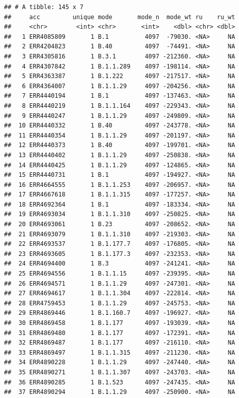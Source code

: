 \documentclass[
]{article}
\begin{document}
\begin{verbatim}
## # A tibble: 145 x 7
##     acc         unique mode       mode_n  mode_wt ru    ru_wt
##     <chr>        <int> <chr>       <int>    <dbl> <chr> <dbl>
##   1 ERR4085809       1 B.1          4097  -79030. <NA>     NA
##   2 ERR4204823       1 B.40         4097  -74491. <NA>     NA
##   3 ERR4305816       1 B.3.1        4097 -212360. <NA>     NA
##   4 ERR4307842       1 B.1.1.289    4097 -198114. <NA>     NA
##   5 ERR4363387       1 B.1.222      4097 -217517. <NA>     NA
##   6 ERR4364007       1 B.1.1.29     4097 -204256. <NA>     NA
##   7 ERR4440194       1 B.1          4097 -137463. <NA>     NA
##   8 ERR4440219       1 B.1.1.164    4097 -229343. <NA>     NA
##   9 ERR4440247       1 B.1.1.29     4097 -249809. <NA>     NA
##  10 ERR4440332       1 B.40         4097 -243778. <NA>     NA
##  11 ERR4440354       1 B.1.1.29     4097 -201197. <NA>     NA
##  12 ERR4440373       1 B.40         4097 -199701. <NA>     NA
##  13 ERR4440402       1 B.1.1.29     4097 -250838. <NA>     NA
##  14 ERR4440425       1 B.1.1.29     4097 -124865. <NA>     NA
##  15 ERR4440731       1 B.1          4097 -194927. <NA>     NA
##  16 ERR4664555       1 B.1.1.253    4097 -206957. <NA>     NA
##  17 ERR4667618       1 B.1.1.315    4097 -177257. <NA>     NA
##  18 ERR4692364       1 B.1          4097 -183334. <NA>     NA
##  19 ERR4693034       1 B.1.1.310    4097 -250825. <NA>     NA
##  20 ERR4693061       1 B.23         4097 -208652. <NA>     NA
##  21 ERR4693079       1 B.1.1.310    4097 -219303. <NA>     NA
##  22 ERR4693537       1 B.1.177.7    4097 -176805. <NA>     NA
##  23 ERR4693605       1 B.1.177.3    4097 -232353. <NA>     NA
##  24 ERR4694400       1 B.3          4097 -241241. <NA>     NA
##  25 ERR4694556       1 B.1.1.15     4097 -239395. <NA>     NA
##  26 ERR4694571       1 B.1.1.29     4097 -247301. <NA>     NA
##  27 ERR4694617       1 B.1.1.304    4097 -222814. <NA>     NA
##  28 ERR4759453       1 B.1.1.29     4097 -245753. <NA>     NA
##  29 ERR4869446       1 B.1.160.7    4097 -196927. <NA>     NA
##  30 ERR4869458       1 B.1.177      4097 -193039. <NA>     NA
##  31 ERR4869480       1 B.1.177      4097 -172391. <NA>     NA
##  32 ERR4869487       1 B.1.177      4097 -216110. <NA>     NA
##  33 ERR4869497       1 B.1.1.315    4097 -211230. <NA>     NA
##  34 ERR4890228       1 B.1.1.29     4097 -247440. <NA>     NA
##  35 ERR4890271       1 B.1.1.307    4097 -243703. <NA>     NA
##  36 ERR4890285       1 B.1.523      4097 -247435. <NA>     NA
##  37 ERR4890294       1 B.1.1.29     4097 -250900. <NA>     NA

\end{verbatim}
\end{document}
